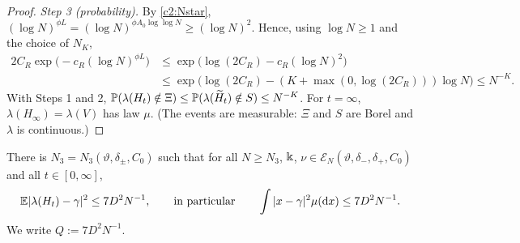 \begin{proof}
\emph{Step 3 (probability).} By \eqref{c2:Nstar}, $(\log N)^{\phi L}=(\log N)^{\phi A_0\log\log N}\ge(\log N)^2$. Hence, using $\log N\ge1$ and the choice of $N_K$,
\begin{align*}
2C_R\exp\big(-c_R(\log N)^{\phi L}\big)&\le\exp\big(\log(2C_R)-c_R(\log N)^2\big)\\
&\le\exp\big(\log(2C_R)-(K+\max(0,\log(2C_R)))\log N\big)\le N^{-K}.
\end{align*}
With Steps 1 and 2, $\P(\lambda(H_t)\notin\Xi)\le\P(\lambda(\widetilde H_t)\notin S)\le N^{-K}$. For $t=\infty$, $\lambda(H_\infty)=\lambda(V)$ has law $\mu$.
(The events are measurable: $\Xi$ and $S$ are Borel and $\lambda$ is continuous.)
\end{proof}

\begin{lemma}\label{lem:Q}
There is $N_3=N_3(\vartheta,\delta_\pm,C_0)$ such that for all $N\ge N_3$, $\K$, $\nu\in\mathcal E_N(\vartheta,\delta_-,\delta_+,C_0)$ and all $t\in[0,\infty]$,
\begin{equation}\label{Qbound}
\E|\lambda(H_t)-\gamma|^2\le 7D^2N^{-1},\qquad\text{in particular}\qquad \int|x-\gamma|^2\mu(\rd x)\le7D^2N^{-1}.
\end{equation}
We write $Q:=7D^2N^{-1}$.
\end{lemma}

